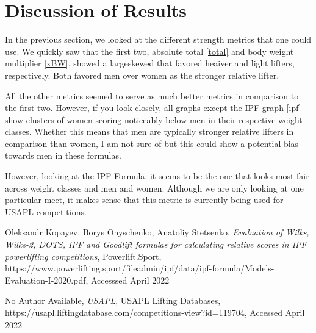 \documentclass[10pt,letterpaper]{article}
\begin{document}
    \section{Discussion of Results}
    In the previous section, we looked at the different strength metrics that one could use. We quickly saw that the first two, absolute total \ref{total} and body weight multiplier \ref{xBW}, showed a largeskewed that favored heaiver and light lifters, respectively. Both favored men over women as the stronger relative lifter.

    All the other metrics seemed to serve as much better metrics in comparison to the first two. However, if you look closely, all graphs except the IPF graph \ref{ipf} show clusters of women scoring noticeably below men in their respective weight classes. Whether this means that men are typically stronger relative lifters in comparison than women, I am not sure of but this could show a potential bias towards men in these formulas.

    However, looking at the IPF Formula, it seems to be the one that looks most fair across weight classes and men and women. Although we are only looking at one particular meet, it makes sense that this metric is currently being used for USAPL competitions.

    \newpage 
    \begin{thebibliography}{}
        Oleksandr Kopayev, Borys Onyschenko, Anatoliy Stetsenko,
        \textit{Evaluation of Wilks, Wilks-2, DOTS, IPF and Goodlift formulas for calculating relative scores in IPF powerlifting
        competitions}, Powerlift.Sport, https://www.powerlifting.sport/fileadmin/ipf/data/ipf-formula/Models-Evaluation-I-2020.pdf, Accesssed April 2022
        
        No Author Available,
        \textit{USAPL}, USAPL Lifting Databases, https://usapl.liftingdatabase.com/competitions-view?id=119704, Accessed April 2022
        \end{thebibliography}
\end{document}
